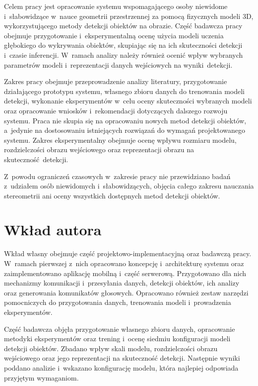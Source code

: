 Celem pracy jest opracowanie systemu wspomagającego osoby niewidome i~słabowidzące w~nauce geometrii przestrzennej za pomocą fizycznych modeli 3D, wykorzystującego metody detekcji obiektów na obrazie. Część badawcza pracy obejmuje przygotowanie i~eksperymentalną ocenę użycia modeli uczenia głębokiego do wykrywania obiektów, skupiając się na ich skuteczności detekcji i~czasie inferencji. W~ramach analizy należy również ocenić wpływ wybranych parametrów modeli i~reprezentacji danych wejściowych na wyniki~detekcji.

Zakres pracy obejmuje przeprowadzenie analizy literatury, przygotowanie działającego prototypu systemu, własnego zbioru danych do trenowania modeli detekcji, wykonanie eksperymentów w~celu oceny skuteczności wybranych modeli oraz opracowanie wniosków i~rekomendacji dotyczących dalszego rozwoju systemu. Praca nie skupia się na opracowaniu nowych metod detekcji obiektów, a~jedynie na dostosowaniu istniejących rozwiązań do wymagań projektowanego systemu. Zakres eksperymentalny obejmuje ocenę wpływu rozmiaru modelu, rozdzielczości obrazu wejściowego oraz reprezentacji obrazu na skuteczność~detekcji.

Z~powodu ograniczeń czasowych w~zakresie pracy nie przewidziano badań z~udziałem osób niewidomych i~słabowidzących, objęcia całego zakresu nauczania stereometrii ani oceny wszystkich dostępnych metod detekcji obiektów.

\section{Wkład autora}

Wkład własny obejmuje część projektowo-implementacyjną oraz badawczą pracy. W~ramach pierwszej z~nich opracowano koncepcję i~architekturę systemu oraz zaimplementowano aplikację mobilną i~część serwerową. Przygotowano dla nich mechanizmy komunikacji i~przesyłania danych, detekcji obiektów, ich analizy oraz generowania komunikatów głosowych. Opracowano również zestaw narzędzi pomocniczych do przygotowania danych, trenowania modeli i~prowadzenia eksperymentów.

Część badawcza objęła przygotowanie własnego zbioru danych, opracowanie metodyki eksperymentów oraz trening i~ocenę siedmiu konfiguracji modeli detekcji obiektów. Zbadano wpływ skali modelu, rozdzielczości obrazu wejściowego oraz jego reprezentacji na skuteczność detekcji. Następnie wyniki poddano analizie i~wskazano konfigurację modelu, która najlepiej odpowiada przyjętym wymaganiom.

